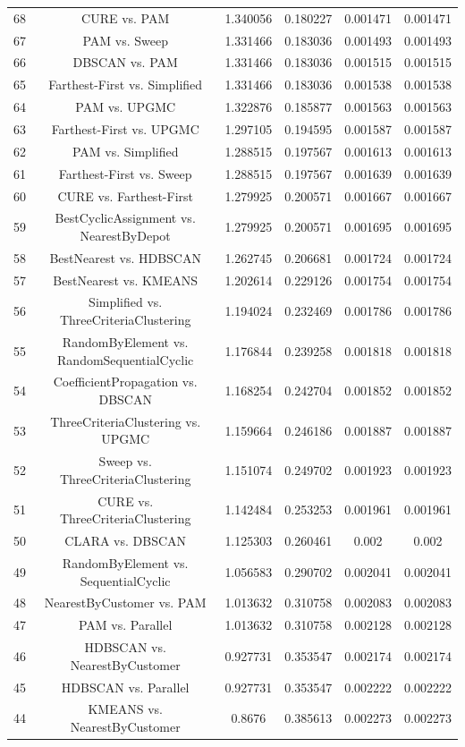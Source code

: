 \documentclass[a4paper,10pt]{article}
\begin{document}
\begin{landscape}
\begin{table}[!htp]
\begin{tabular}{cccccc}
68&CURE vs. PAM&1.340056&0.180227&0.001471&0.001471\\
67&PAM vs. Sweep&1.331466&0.183036&0.001493&0.001493\\
66&DBSCAN vs. PAM&1.331466&0.183036&0.001515&0.001515\\
65&Farthest-First vs. Simplified&1.331466&0.183036&0.001538&0.001538\\
64&PAM vs. UPGMC&1.322876&0.185877&0.001563&0.001563\\
63&Farthest-First vs. UPGMC&1.297105&0.194595&0.001587&0.001587\\
62&PAM vs. Simplified&1.288515&0.197567&0.001613&0.001613\\
61&Farthest-First vs. Sweep&1.288515&0.197567&0.001639&0.001639\\
60&CURE vs. Farthest-First&1.279925&0.200571&0.001667&0.001667\\
59&BestCyclicAssignment vs. NearestByDepot&1.279925&0.200571&0.001695&0.001695\\
58&BestNearest vs. HDBSCAN&1.262745&0.206681&0.001724&0.001724\\
57&BestNearest vs. KMEANS&1.202614&0.229126&0.001754&0.001754\\
56&Simplified vs. ThreeCriteriaClustering&1.194024&0.232469&0.001786&0.001786\\
55&RandomByElement vs. RandomSequentialCyclic&1.176844&0.239258&0.001818&0.001818\\
54&CoefficientPropagation vs. DBSCAN&1.168254&0.242704&0.001852&0.001852\\
53&ThreeCriteriaClustering vs. UPGMC&1.159664&0.246186&0.001887&0.001887\\
52&Sweep vs. ThreeCriteriaClustering&1.151074&0.249702&0.001923&0.001923\\
51&CURE vs. ThreeCriteriaClustering&1.142484&0.253253&0.001961&0.001961\\
50&CLARA vs. DBSCAN&1.125303&0.260461&0.002&0.002\\
49&RandomByElement vs. SequentialCyclic&1.056583&0.290702&0.002041&0.002041\\
48&NearestByCustomer vs. PAM&1.013632&0.310758&0.002083&0.002083\\
47&PAM vs. Parallel&1.013632&0.310758&0.002128&0.002128\\
46&HDBSCAN vs. NearestByCustomer&0.927731&0.353547&0.002174&0.002174\\
45&HDBSCAN vs. Parallel&0.927731&0.353547&0.002222&0.002222\\
44&KMEANS vs. NearestByCustomer&0.8676&0.385613&0.002273&0.002273\\

\end{tabular}
\end{table}
\end{landscape}
\end{document}
